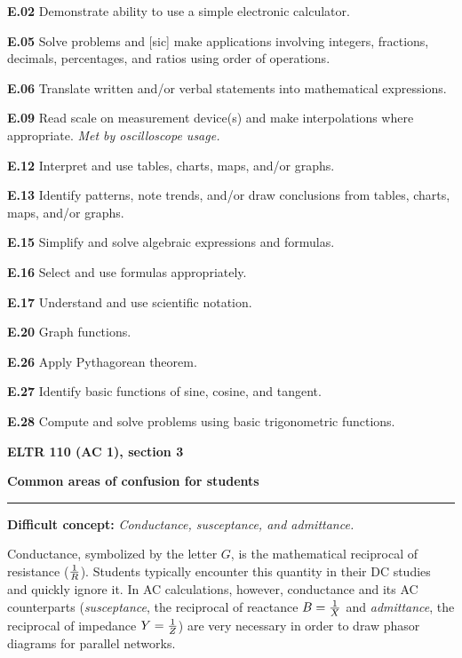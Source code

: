\item{\bf E.02} Demonstrate ability to use a simple electronic calculator.
\item{\bf E.05} Solve problems and [sic] make applications involving integers, fractions, decimals, percentages, and ratios using order of operations.
\item{\bf E.06} Translate written and/or verbal statements into mathematical expressions.
\item{\bf E.09} Read scale on measurement device(s) and make interpolations where appropriate.  {\it Met by oscilloscope usage.}
\item{\bf E.12} Interpret and use tables, charts, maps, and/or graphs.
\item{\bf E.13} Identify patterns, note trends, and/or draw conclusions from tables, charts, maps, and/or graphs.
\item{\bf E.15} Simplify and solve algebraic expressions and formulas.
\item{\bf E.16} Select and use formulas appropriately.
\item{\bf E.17} Understand and use scientific notation.
\item{\bf E.20} Graph functions.
\item{\bf E.26} Apply Pythagorean theorem.
\item{\bf E.27} Identify basic functions of sine, cosine, and tangent.
\item{\bf E.28} Compute and solve problems using basic trigonometric functions.
\medskip





\vfil \eject

\centerline{\bf ELTR 110 (AC 1), section 3} \bigskip 
 
\vskip 10pt

\noindent
{\bf Common areas of confusion for students}

\vskip 5pt

\hrule \vskip 5pt

\vskip 10pt

\noindent
{\bf Difficult concept: } {\it Conductance, susceptance, and admittance.}

Conductance, symbolized by the letter $G$, is the mathematical reciprocal of resistance ($1 \over R$).  Students typically encounter this quantity in their DC studies and quickly ignore it.  In AC calculations, however, conductance and its AC counterparts ({\it susceptance}, the reciprocal of reactance $B = {1 \over X}$ and {\it admittance}, the reciprocal of impedance $Y = {1 \over Z}$) are very necessary in order to draw phasor diagrams for parallel networks.

